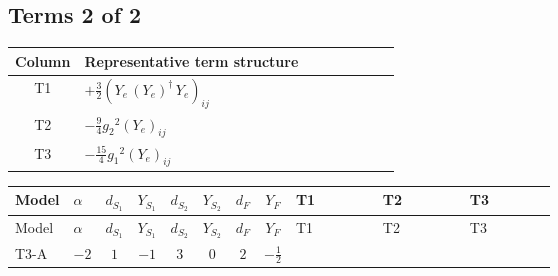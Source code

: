 \documentclass[8pt]{article}
\begin{document}
\begin{landscape}
\subsection*{Terms 2 of 2}
\begin{center}
\begin{tabular}{@{}c >{\raggedright\arraybackslash}p{0.82\linewidth}@{}}
\toprule
Column & Representative term structure \\
\midrule
T1 & \(\displaystyle +\frac{3}{2} \left({Y_e}\,\left({Y_e}\right)^{\dagger}\,{Y_e}\right)_{ij}\) \\
\midrule
T2 & \(\displaystyle -\frac{9}{4} {g_2}^2 \left({Y_e}\right)_{ij}\) \\
\midrule
T3 & \(\displaystyle -\frac{15}{4} {g_1}^2 \left({Y_e}\right)_{ij}\) \\
\midrule
\bottomrule
\end{tabular}
\end{center}
\smallskip
\tiny
\begin{longtable}{@{}llcccccc >{\raggedright\arraybackslash}p{0.21\linewidth} >{\raggedright\arraybackslash}p{0.21\linewidth} >{\raggedright\arraybackslash}p{0.21\linewidth}@{}}
\toprule
Model & $\alpha$ & $d_{S_1}$ & $Y_{S_1}$ & $d_{S_2}$ & $Y_{S_2}$ & $d_F$ & $Y_F$ & T1 & T2 & T3 \\
\midrule
\endfirsthead
\toprule
Model & $\alpha$ & $d_{S_1}$ & $Y_{S_1}$ & $d_{S_2}$ & $Y_{S_2}$ & $d_F$ & $Y_F$ & T1 & T2 & T3 \\
\midrule
\endhead
T3-A & $-2$ & $1$ & $-1$ & $3$ & $0$ & $2$ & $-\frac{1}{2}$ & \scriptsize\adjustbox{max width=\linewidth}{$\begin{gathered} +\frac{3}{2} \left({Y_e}\,\left({Y_e}\right)^{\dagger}\,{Y_e}\right)_{ij}\end{gathered}$} & \scriptsize\adjustbox{max width=\linewidth}{$\begin{gathered} -\frac{9}{4} {g_2}^2 \left({Y_e}\right)_{ij}\end{gathered}$} & \scriptsize\adjustbox{max width=\linewidth}{$\begin{gathered} -\frac{15}{4} {g_1}^2 \left({Y_e}\right)_{ij}\end{gathered}$} \\
\midrule
\bottomrule
\end{longtable}
\clearpage

\end{landscape}
\end{document}
